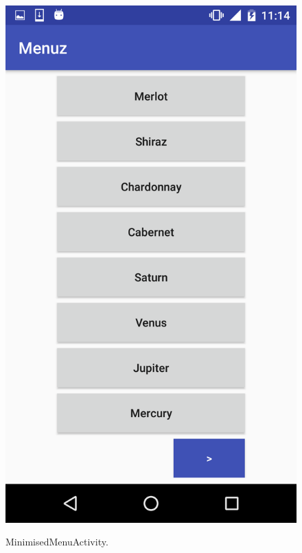 \begin{figure}[!ht]
  \begin{center}
    \includegraphics[scale=0.22]{img/mini_menu.png}
    \label{fig:mini_menu}
    \caption{MinimisedMenuActivity.}
  \end{center}
\end{figure}

\newpage


